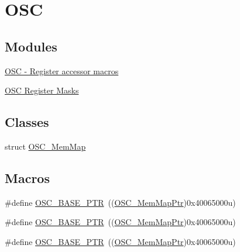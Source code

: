 \hypertarget{group___o_s_c___peripheral}{}\section{O\+SC}
\label{group___o_s_c___peripheral}
\subsection*{Modules}
\begin{DoxyCompactItemize}
\item 
\hyperlink{group___o_s_c___register___accessor___macros}{O\+S\+C -\/ Register accessor macros}
\item 
\hyperlink{group___o_s_c___register___masks}{O\+S\+C Register Masks}
\end{DoxyCompactItemize}
\subsection*{Classes}
\begin{DoxyCompactItemize}
\item 
struct \hyperlink{struct_o_s_c___mem_map}{O\+S\+C\+\_\+\+Mem\+Map}
\end{DoxyCompactItemize}
\subsection*{Macros}
\begin{DoxyCompactItemize}
\item 
\#define \hyperlink{group___o_s_c___peripheral_gaf1086ccc399b36fe95a52c677e9936ac}{O\+S\+C\+\_\+\+B\+A\+S\+E\+\_\+\+P\+TR}~((\hyperlink{group___o_s_c___peripheral_gaaa685163f549fdf24c28ec9b400310b5}{O\+S\+C\+\_\+\+Mem\+Map\+Ptr})0x40065000u)
\item 
\#define \hyperlink{group___o_s_c___peripheral_gaf1086ccc399b36fe95a52c677e9936ac}{O\+S\+C\+\_\+\+B\+A\+S\+E\+\_\+\+P\+TR}~((\hyperlink{group___o_s_c___peripheral_gaaa685163f549fdf24c28ec9b400310b5}{O\+S\+C\+\_\+\+Mem\+Map\+Ptr})0x40065000u)
\item 
\#define \hyperlink{group___o_s_c___peripheral_gaf1086ccc399b36fe95a52c677e9936ac}{O\+S\+C\+\_\+\+B\+A\+S\+E\+\_\+\+P\+TR}~((\hyperlink{group___o_s_c___peripheral_gaaa685163f549fdf24c28ec9b400310b5}{O\+S\+C\+\_\+\+Mem\+Map\+Ptr})0x40065000u)
\end{DoxyCompactItemize}
